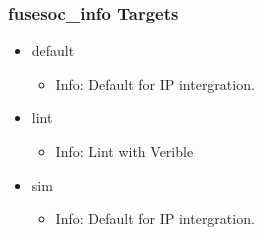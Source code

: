 \subsubsection{fusesoc\_info Targets}
\begin{itemize}
\item default
	\begin{itemize}
	\item[$\space$] Info: Default for IP intergration.
	\end{itemize}
\item lint
	\begin{itemize}
	\item[$\space$] Info: Lint with Verible
	\end{itemize}
\item sim
	\begin{itemize}
	\item[$\space$] Info: Default for IP intergration.
	\end{itemize}
\end{itemize}
